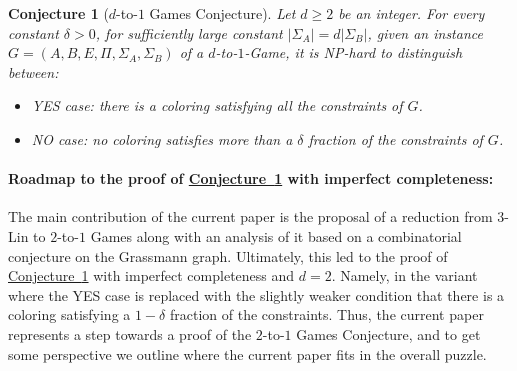 \documentclass[11pt]{article}
\numberwithin{equation}{section}
\theoremstyle{definition}
\theoremstyle{plain}
\newcommand{\expref}[2]{\hyperref[#2]{#1~\ref{#2}}}
\newtheorem{rconj}[theorem]{Conjecture}
\newcommand\card[1]{\left| {#1} \right|}
\renewcommand\geq{\geqslant}
\begin{document}
\begin{rconj}[$d$-to-$1$ Games Conjecture]\label{conj:d-to-1}
Let $d\geq 2$ be an integer. For every constant $\delta>0$, for sufficiently large constant $\card{\Sigma_A}=d\card{\Sigma_B}$,
given an instance $G=(A,B,E,\Pi,\Sigma_A,\Sigma_B)$ of a $d$-to-$1$-Game, it is NP-hard to distinguish between:
\begin{itemize}
\item YES case: there is a coloring satisfying all the constraints of $G$.
\item NO case: no coloring satisfies more than
a %
$\delta$ fraction of the constraints of $G$.
\end{itemize}
\end{rconj}

%
\paragraph{Roadmap to the proof of \expref{Conjecture}{conj:d-to-1} with imperfect completeness:}
The main contribution of the current paper is the proposal of a reduction from $3$-Lin to $2$-to-$1$ Games along
with an analysis of it based on a combinatorial conjecture on the Grassmann graph. Ultimately, this led
to the proof of \expref{Conjecture}{conj:d-to-1} with imperfect completeness and $d=2$. Namely, in the variant where
the YES case is replaced with the slightly weaker
condition that there is a coloring satisfying
a %
$1-\delta$ fraction of the constraints. Thus, the current paper represents
a step towards a proof of the $2$-to-$1$ Games Conjecture, and to get some perspective we outline where the current paper fits
in the overall puzzle.
\end{document}
